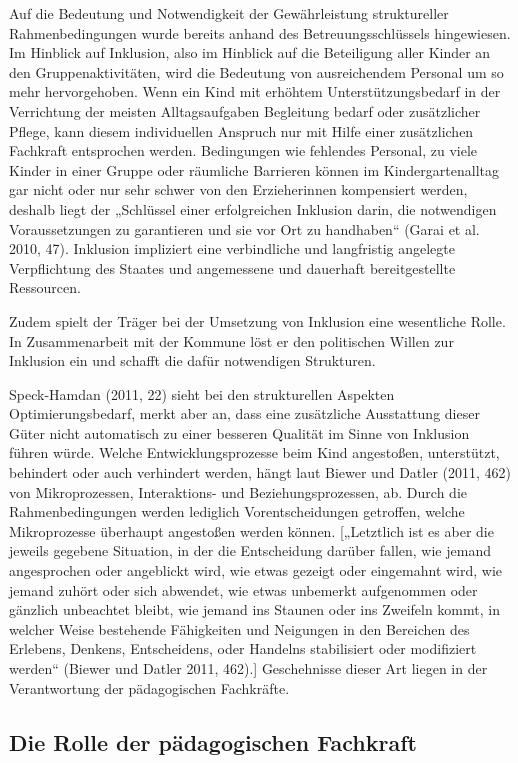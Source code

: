 Auf die Bedeutung und Notwendigkeit der Gewährleistung struktureller Rahmenbedingungen wurde bereits anhand des Betreuungsschlüssels hingewiesen. Im Hinblick auf Inklusion, also im Hinblick auf die Beteiligung aller Kinder an den Gruppenaktivitäten, wird die Bedeutung von ausreichendem Personal um so mehr hervorgehoben. Wenn ein Kind mit erhöhtem Unterstützungsbedarf in der Verrichtung der meisten Alltagsaufgaben Begleitung bedarf oder zusätzlicher Pflege, kann diesem individuellen Anspruch nur mit Hilfe einer zusätzlichen Fachkraft entsprochen werden. Bedingungen wie fehlendes Personal, zu viele Kinder in einer Gruppe oder räumliche Barrieren können im Kindergartenalltag gar nicht oder nur sehr schwer von den Erzieherinnen kompensiert werden, deshalb liegt der „Schlüssel einer erfolgreichen Inklusion darin, die notwendigen Voraussetzungen zu garantieren und sie vor Ort zu handhaben“ (Garai et al. 2010, 47). Inklusion impliziert eine verbindliche und langfristig angelegte Verpflichtung des Staates und angemessene und dauerhaft bereitgestellte Ressourcen.

Zudem spielt der Träger bei der Umsetzung von Inklusion eine wesentliche Rolle. In Zusammenarbeit mit der Kommune löst er den politischen Willen zur Inklusion ein und schafft die dafür notwendigen Strukturen. 

Speck-Hamdan (2011, 22) sieht bei den strukturellen Aspekten Optimierungsbedarf, merkt aber an, dass eine zusätzliche Ausstattung dieser Güter nicht automatisch zu einer besseren Qualität im Sinne von Inklusion führen würde. Welche Entwicklungsprozesse beim Kind angestoßen, unterstützt, behindert oder auch verhindert werden, hängt laut Biewer und Datler (2011, 462) von Mikroprozessen, Interaktions- und Beziehungsprozessen, ab. Durch die Rahmenbedingungen werden lediglich Vorentscheidungen getroffen, welche Mikroprozesse überhaupt angestoßen werden können. [„Letztlich ist es aber die jeweils gegebene Situation, in der die Entscheidung darüber fallen, wie jemand angesprochen oder angeblickt wird, wie etwas gezeigt oder eingemahnt wird, wie jemand zuhört oder sich abwendet, wie etwas unbemerkt aufgenommen oder gänzlich unbeachtet bleibt, wie jemand ins Staunen oder ins Zweifeln kommt, in welcher Weise bestehende Fähigkeiten und Neigungen in den Bereichen des Erlebens, Denkens, Entscheidens, oder Handelns stabilisiert oder modifiziert werden“ (Biewer und Datler 2011, 462).] Geschehnisse dieser Art liegen in der Verantwortung der pädagogischen Fachkräfte. 

\subsection{Die Rolle der pädagogischen Fachkraft}

